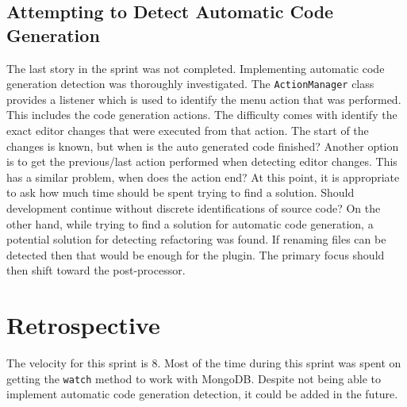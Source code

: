 \subsection{Attempting to Detect Automatic Code Generation}
The last story in the sprint was not completed. Implementing automatic code generation detection was thoroughly investigated. The \texttt{ActionManager} class provides a listener which is used to identify the menu action that was performed. This includes the code generation actions. The difficulty comes with identify the exact editor changes that were executed from that action. The start of the changes is known, but when is the auto generated code finished? Another option is to get the previous/last action performed when detecting editor changes. This has a similar problem, when does the action end? At this point, it is appropriate to ask how much time should be spent trying to find a solution. Should development continue without discrete identifications of source code? On the other hand, while trying to find a solution for automatic code generation, a potential solution for detecting refactoring was found. If renaming files can be detected then that would be enough for the plugin. The primary focus should then shift toward the post-processor.

\section{Retrospective}
The velocity for this sprint is 8. Most of the time during this sprint was spent on getting the \texttt{watch} method to work with MongoDB. Despite not being able to implement automatic code generation detection, it could be added in the future.
